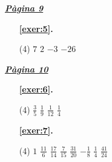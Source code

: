 
 \vspace{1cm} 
 

\vspace{0.3cm}


\hyperlink{page.9}{\textbf{\em Pàgina 9}}
\begin{enumerate}



 \item[\fontfamily{phv}\selectfont\color{blue}\textbf{\ref{exer:5}. }] \label{ans:5}
 \begin{tasks}[column-sep=1em, item-indent=1.3333em](4)
	 \task $7$
	 \task $2$
	 \task $-3$
	 \task $-26$
\end{tasks}
 \end{enumerate}
\vspace{0.3cm}


\hyperlink{page.10}{\textbf{\em Pàgina 10}}
\begin{enumerate}



 \item[\fontfamily{phv}\selectfont\color{blue}\textbf{\ref{exer:6}. }] \label{ans:6}
 \begin{tasks}[column-sep=1em, item-indent=1.3333em](4)
	 \task $\frac {3}{5}$
	 \task $\frac {1}{9}$
	 \task $\frac {1}{12}$
	 \task $\frac {1}{4}$
\end{tasks}
 \end{enumerate}
\begin{enumerate}



 \item[\fontfamily{phv}\selectfont\color{blue}\textbf{\ref{exer:7}. }] \label{ans:7}
 \begin{tasks}[column-sep=1em, item-indent=1.3333em](4)
	 \task $1$
	 \task $\frac {11}{6}$
	 \task $\frac {17}{14}$
	 \task $\frac {7}{15}$
	 \task $\frac {31}{20}$
	 \task $-\frac {1}{8}$
	 \task $\frac {1}{4}$
	 \task $\frac {41}{24}$
\end{tasks}
 \end{enumerate}
\vspace{0.3cm}


